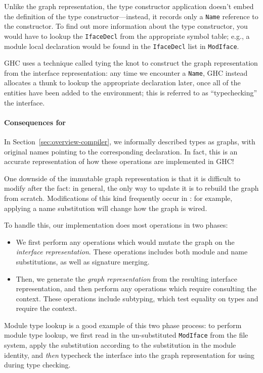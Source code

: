 \noindent
Unlike the graph representation, the type constructor application
doesn't embed the definition of the type constructor---instead,
it records only a \verb|Name| reference to the constructor. To find out
more information about the type constructor, you would have to lookup
the \verb|IfaceDecl| from the appropriate symbol table; e.g., a module
local declaration would be found in the \verb|IfaceDecl| list in
\verb|ModIface|.

GHC uses a technique called tying the knot
to construct the graph representation from the interface
representation: any time we encounter a \verb|Name|, GHC instead
allocates a thunk to lookup the appropriate declaration later,
once all of the entities have been added to the environment;
this is referred to as ``typechecking'' the interface.

\paragraph{Consequences for \Backpack{}}
In Section~\ref{sec:overview-compiler}, we informally described
types as graphs, with original names pointing to the corresponding
declaration.  In fact, this is an accurate representation of how
these operations are implemented in GHC\@!

One downside of the immutable graph representation is that it is
difficult to modify after the fact: in general, the only way to update
it is to rebuild the graph from scratch.  Modifications of this kind
frequently occur in \Backpack{}: for example, applying a name
substitution will change how the graph is wired.

To handle this, our implementation does most operations in two
phases:

\begin{itemize}
    \item We first perform any operations which would
    mutate the graph on the \emph{interface representation}.
    These operations includes both module and name substitutions, as well
    as signature merging.
    \item Then, we generate the \emph{graph representation} from
    the resulting interface representation, and then perform any
    operations which require consulting the context.  These
    operations include subtyping, which test equality on types
    and require the context.
\end{itemize}
%
Module type lookup is a good example of this two phase process: to
perform module type lookup, we first read in the un-substituted
\verb|ModIface| from the file system, apply the substitution according
to the substitution in the module identity, and \emph{then} typecheck
the interface into the graph representation for using during type
checking.

